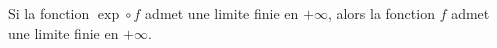 Si la fonction $\exp\circ f$ admet une limite finie en $+\infty$, alors la fonction $f$ admet une limite finie en $+\infty$.

\begin{reponses}
\end{reponses}

